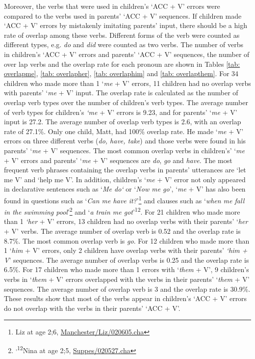 Moreover, the verbs that were used in children's `ACC + V' errors were compared to the verbs used in parents' `ACC + V' sequences. If children made `ACC + V' errors by mistakenly imitating parents' input, there should be a high rate of overlap among these verbs. Different forms of the verb were counted as different types, e.g. \textit{do} and \textit{did} were counted as two verbs. The number of verbs in children's `ACC + V' errors and parents' `ACC + V' sequences, the number of over lap verbs and the overlap rate for each pronoun are shown in Tables \ref{tab: overlapme}, \ref{tab: overlapher}, \ref{tab: overlaphim} and \ref{tab: overlapthem}. 
For 34 children who made more than 1 `\textit{me} + V' errors, 11 children had no overlap verbs with parents' `\textit{me} + V' input. The overlap rate is calculated as the number of overlap verb types over the number of children's verb types. The average number of verb types for children's \textit{`me} + V' errors is 9.23, and for parents' `\textit{me} + V' input is 27.2. The average number of overlap verb types is 2.6, with an overlap rate of 27.1\%. Only one child, Matt, had 100\% overlap rate. He made `\textit{me} + V' errors on three different verbs (\textit{do, have, take}) and those verbs were found in his parents' `\textit{me} + V' sequences. The most common overlap verbs in children's' `\textit{me} + V' errors and parents' `\textit{me} + V' sequences are \textit{do}, \textit{go} and \textit{have}. The most frequent verb phrases containing the overlap verbs in parents' utterances are `let me V' and `help me V'. In addition, children's `\textit{me} + V' error not only appeared in declarative sentences such as `\textit{Me do‘} or `\textit{Now me go}’, `\textit{me} + V' has also been found in questions such as `\textit{Can me have it?}'\footnote{Liz at age 2;6, \href{https://childes.talkbank.org/browser/index.php?url=Eng-UK/Manchester/Liz/020605.cha}{Manchester/Liz/020605.cha}} and clauses such as `\textit{when me fall in the swimming pool}'\footnote{\textsuperscript{,12}Nina at age 2;5, \href{https://childes.talkbank.org/browser/index.php?url=Eng-NA/Suppes/020527.cha}{Suppes/020527.cha}} and  `\textit{a train me got}'\textsuperscript{12}. For 21 children who made more than 1 \textit{`her} + V' errors, 13 children had no overlap verbs with their parents' `\textit{her} + V' verbs. The average number of overlap verb is 0.52 and the overlap rate is 8.7\%. The most common overlap verb is \textit{go}. For 12 children who made more than 1 `\textit{him} + V' errors, only 2 children have overlap verbs with their parents' \textit{`him + V}' sequences. The average number of overlap verbs is 0.25 and the overlap rate is 6.5\%. For 17 children who made more than 1 errors with `\textit{them} + V', 9 children's verbs in `\textit{them} + V' errors overlapped with the verbs in their parents' `\textit{them} + V' sequences. The average number of overlap verb is 3 and the overlap rate is 30.9\%. These results show that most of the verbs appear in children's `ACC + V' errors do not overlap with the verbs in their parents' `ACC + V'. 

